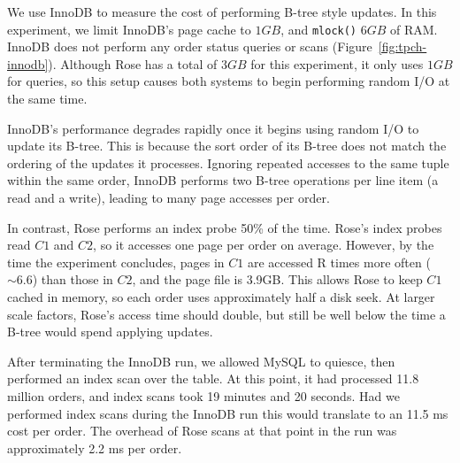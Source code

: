 \documentclass{vldb}
\newcommand{\rows}{Rose\xspace}
\newcommand{\rowss}{Rose's\xspace}
\begin{document}
We use InnoDB to measure the cost of performing B-tree style updates.
In this experiment, we limit InnoDB's page cache to $1GB$, and {\tt mlock()} $6GB$
of RAM.  InnoDB does not perform any order status queries or scans (Figure~\ref{fig:tpch-innodb}).
Although \rows has a total of $3GB$ for this
experiment, it only uses $1GB$ for queries, so this setup causes both
systems to begin performing random I/O at the same time.

InnoDB's performance degrades rapidly once it begins using random I/O
to update its B-tree.  This is because the sort order of its B-tree
does not match the ordering of the updates it processes.  Ignoring
repeated accesses to the same tuple within the same order, InnoDB
performs two B-tree operations per line item (a read and a write),
leading to many page accesses per order.

In contrast, \rows performs an index probe 50\% of the time.  \rowss
index probes read $C1$ and $C2$, so it accesses one page per order on
average.  However, by the time the experiment concludes, pages in $C1$
are accessed R times more often ($\sim6.6$) than those in $C2$, and
the page file is 3.9GB.  This allows \rows to keep $C1$ cached in
memory, so each order uses approximately half a disk seek.  At larger
scale factors, \rowss access time should double, but still be well
below the time a B-tree would spend applying updates.

After terminating the InnoDB run, we allowed MySQL to quiesce, then
performed an index scan over the table.  At this point, it had
processed 11.8 million orders, and index scans took 19 minutes and 20
seconds.  Had we performed index scans during the InnoDB run this
would translate to an 11.5 ms cost per order. The overhead of \rows
scans at that point in the run was approximately 2.2 ms per order.

%
\end{document}
